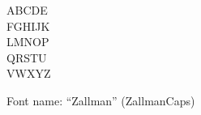 \documentclass[a4paper]{article}
\begin{document}
\begin{center}
\fontsize{60pt}{72pt}
  ABCDE \\
  FGHIJK \\
  LMNOP \\
  QRSTU \\
  VWXYZ \\
\end{center}
\vfill
\begin{center}
Font name: ``Zallman'' (ZallmanCaps)
\end{center}
\end{document}
